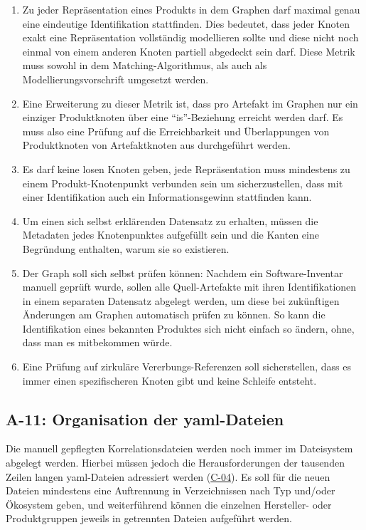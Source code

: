 \begin{enumerate}
    \item Zu jeder Repräsentation eines Produkts in dem Graphen darf maximal genau eine eindeutige Identifikation stattfinden.
    Dies bedeutet, dass jeder Knoten exakt eine Repräsentation vollständig modellieren sollte und diese nicht noch einmal von einem anderen Knoten partiell abgedeckt sein darf.
    Diese Metrik muss sowohl in dem Matching-Algorithmus, als auch als Modellierungsvorschrift umgesetzt werden.
    \item Eine Erweiterung zu dieser Metrik ist, dass pro Artefakt im Graphen nur ein einziger Produktknoten über eine \enquote{is}-Beziehung erreicht werden darf.
    Es muss also eine Prüfung auf die Erreichbarkeit und Überlappungen von Produktknoten von Artefaktknoten aus durchgeführt werden.
    \item Es darf keine losen Knoten geben, jede Repräsentation muss mindestens zu einem Produkt-Knotenpunkt verbunden sein um sicherzustellen, dass mit einer Identifikation auch ein Informationsgewinn stattfinden kann.
    \item Um einen sich selbst erklärenden Datensatz zu erhalten, müssen die Metadaten jedes Knotenpunktes aufgefüllt sein und die Kanten eine Begründung enthalten, warum sie so existieren.
    \item Der Graph soll sich selbst prüfen können: Nachdem ein Software-Inventar manuell geprüft wurde, sollen alle Quell-Artefakte mit ihren Identifikationen in einem separaten Datensatz abgelegt werden, um diese bei zukünftigen Änderungen am Graphen automatisch prüfen zu können.
    So kann die Identifikation eines bekannten Produktes sich nicht einfach so ändern, ohne, dass man es mitbekommen würde.
    \item Eine Prüfung auf zirkuläre Vererbungs-Referenzen soll sicherstellen, dass es immer einen spezifischeren Knoten gibt und keine Schleife entsteht.
\end{enumerate}

\subsection{A-11: Organisation der \acrshort{yaml}-Dateien}\label{subsec:req-yaml-file-organization}

Die manuell gepflegten Korrelationsdateien werden noch immer im Dateisystem abgelegt werden.
Hierbei müssen jedoch die Herausforderungen der tausenden Zeilen langen \acrshort{yaml}-Dateien adressiert werden (\hyperref[subsec:c-04-groe-und-unubersichtliche-yaml-dateien]{C-04}).
Es soll für die neuen Dateien mindestens eine Auftrennung in Verzeichnissen nach Typ und/oder Ökosystem geben, und weiterführend können die einzelnen Hersteller- oder Produktgruppen jeweils in getrennten Dateien aufgeführt werden.

